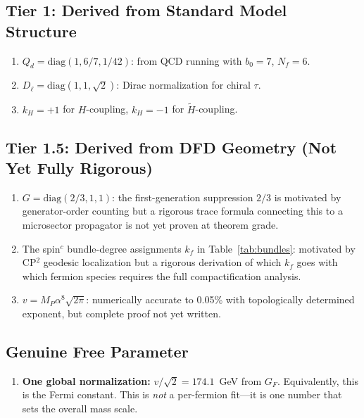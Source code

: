 \documentclass[11pt,a4paper]{article}
\theoremstyle{remark}
\begin{document}
\subsection{Tier 1: Derived from Standard Model Structure}

\begin{enumerate}
\item $Q_d = \mathrm{diag}(1, 6/7, 1/42)$: from QCD running with $b_0 = 7$, $N_f = 6$.
\item $D_\ell = \mathrm{diag}(1, 1, \sqrt{2})$: Dirac normalization for chiral $\tau$.
\item $k_H = +1$ for $H$-coupling, $k_H = -1$ for $\widetilde{H}$-coupling.
\end{enumerate}

\subsection{Tier 1.5: Derived from DFD Geometry (Not Yet Fully Rigorous)}

\begin{enumerate}
\item $G = \mathrm{diag}(2/3, 1, 1)$: the first-generation suppression $2/3$
  is motivated by generator-order counting but a rigorous trace formula
  connecting this to a microsector propagator is not yet proven at theorem grade.
\item The spin$^c$ bundle-degree assignments $k_f$ in Table~\ref{tab:bundles}:
  motivated by CP$^2$ geodesic localization but a rigorous derivation of which
  $k_f$ goes with which fermion species requires the full compactification analysis.
\item $v = M_P\alpha^8\sqrt{2\pi}$: numerically accurate to 0.05\% with
  topologically determined exponent, but complete proof not yet written.
\end{enumerate}

\subsection{Genuine Free Parameter}

\begin{enumerate}
\item \textbf{One global normalization:} $v/\sqrt{2} = 174.1$~GeV from $G_F$.
  Equivalently, this is the Fermi constant.  This is \emph{not} a per-fermion
  fit---it is one number that sets the overall mass scale.
\end{enumerate}
\end{document}
